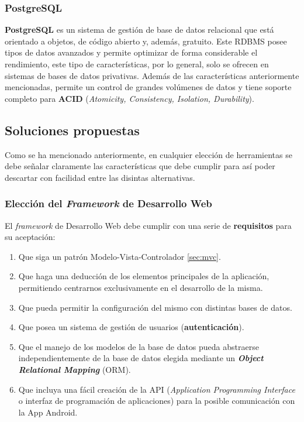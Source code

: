     \subsubsection{PostgreSQL}
    \textbf{PostgreSQL} \cite{postgresql} es un sistema de gestión de base de datos relacional
    que está orientado a objetos, de código abierto y, además, gratuito. Este RDBMS posee tipos
    de datos avanzados y permite optimizar de forma considerable el rendimiento, este tipo de
    características, por lo general, solo se ofrecen en sistemas de bases de datos privativas.
    Además de las características anteriormente mencionadas, permite un control de grandes
    volúmenes de datos y tiene soporte completo para \textbf{ACID} (\textit{Atomicity,
    Consistency, Isolation, Durability}).

\subsection{Soluciones propuestas}
Como se ha mencionado anteriormente, en cualquier elección de herramientas se debe señalar
claramente las características que debe cumplir para así poder descartar con facilidad
entre las disintas alternativas.

    \subsubsection{Elección del \textit{Framework} de Desarrollo Web}
    El \textit{framework} de Desarrollo Web debe cumplir con una serie de \textbf{requisitos} para
    su aceptación:

        \begin{enumerate}
            \item Que siga un patrón Modelo-Vista-Controlador \ref{sec:mvc}.
            \item Que haga una deducción de los elementos principales de la aplicación,
            permitiendo centrarnos exclusivamente en el desarrollo de la misma.
            \item Que pueda permitir la configuración del mismo con distintas bases de
            datos.
            \item Que posea un sistema de gestión de usuarios (\textbf{autenticación}).
            \item Que el manejo de los modelos de la base de datos pueda abstraerse
            independientemente de la base de datos elegida mediante un
            \textbf{\textit{Object Relational Mapping}} (ORM).
            \item Que incluya una fácil creación de la API (\textit{Application Programming
            Interface} o interfaz de programación de aplicaciones) para la posible
            comunicación con la App Android.
        \end{enumerate}

